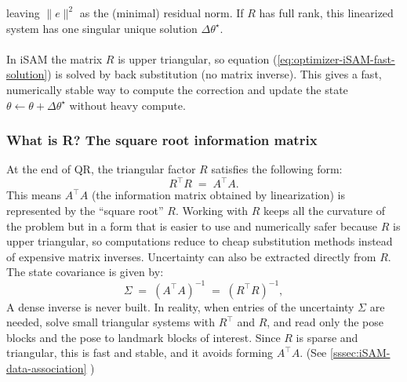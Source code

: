 \noindent
leaving $\|e\|^2$ as the (minimal) residual norm. If $R$ has full rank, this linearized system has one singular unique solution $\Delta\theta^\star$.
\\ \\
In iSAM the matrix $R$ is upper triangular, so equation (\ref{eq:optimizer-iSAM-fast-solution}) is solved by back substitution (no matrix inverse). This gives a fast, numerically stable way to compute the correction and update the state $\theta \leftarrow \theta + \Delta\theta^\star$ without heavy compute.



\subsubsection{What is R? The square root information matrix}
At the end of QR, the triangular factor $R$ satisfies the following form:
$$
R^\top R \;=\; A^\top A .
$$
This means $A^\top A$ (the information matrix obtained by linearization) is represented by the ``square root'' $R$. Working with $R$ keeps all the curvature of the problem but in a form that is easier to use and numerically safer because $R$ is upper triangular, so computations reduce to cheap substitution methods instead of expensive matrix inverses. Uncertainty can also be extracted directly from $R$. The state covariance is given by:
$$
\Sigma \;=\; (A^\top A)^{-1} \;=\; (R^\top R)^{-1},
$$
A dense inverse is never built. In reality, when entries of the uncertainty $\Sigma$ are needed, solve small triangular systems with $R^\top$ and $R$, and read only the pose blocks and the pose to landmark blocks of interest. Since $R$ is sparse and triangular, this is fast and stable, and it avoids forming $A^\top A$. (See \ref{sssec:iSAM-data-association} )



